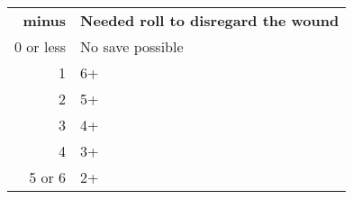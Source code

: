 \documentclass[a4paper,10pt]{article}
\begin{document}
\begin{minipage}[t]{0.485\textwidth}

\begin{center}
  \begin{tabular}{r l}
  \hline
    \textbf{\Armour{} minus \AP{}} & \textbf{Needed roll to disregard the wound} \\
    0 or less & No save possible \\
    1 & 6+ \\
    2 & 5+ \\
    3 & 4+ \\
    4 & 3+ \\
    5 or 6 & 2+ \\
    \hline
  \end{tabular}
\end{center}

\end{minipage}

\newpage
{}
\end{document}
